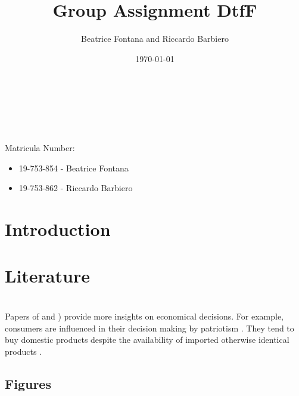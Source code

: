 \documentclass[a4paper, 12pt, english]{article}
\begin{document}
		
\title{Group Assignment DtfF}		
\author{Beatrice Fontana and Riccardo Barbiero}

\date{\today}
\maketitle
Matricula Number:
    \begin{itemize}
        \item 19-753-854 - Beatrice Fontana
        \item 19-753-862 - Riccardo Barbiero 
    \end{itemize}  
    
\begin{abstract}
\blindtext[1]
\\
\\
\\
\end{abstract}

\newpage
{}


\tableofcontents

\clearpage

\section{Introduction}
\blindtext[1]



\clearpage
\section{Literature}
\blindtext[1] \\

Papers of \cite{clift2012economic} and  \cite{morgan2012supporting}) provide more insights on economical decisions. For example, consumers are influenced in their decision making by patriotism \citep{spielmann2018product}. 
They tend to buy domestic products despite the availability of imported otherwise identical products \citep{shankarmahesh2006consumer}.\\


\subsection{Figures}
\blindtext[1]\\
\end{document}
